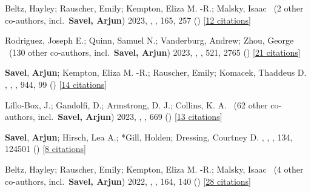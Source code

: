 \item[{\color{numcolor}\scriptsize22}] Beltz, Hayley; Rauscher, Emily; Kempton, Eliza M. -R.; Malsky, Isaac \etal\ ({2} other co-authors, incl.\ \textbf{Savel, Arjun}) 2023, , \aj, {165}, 257 () [\href{https://ui.adsabs.harvard.edu/abs/2023AJ....165..257B}{12 citations}]

\item[{\color{numcolor}\scriptsize21}] Rodriguez, Joseph E.; Quinn, Samuel N.; Vanderburg, Andrew; Zhou, George \etal\ ({130} other co-authors, incl.\ \textbf{Savel, Arjun}) 2023, , \mnras, {521}, 2765 () [\href{https://ui.adsabs.harvard.edu/abs/2023MNRAS.521.2765R}{21 citations}]

\item[{\color{numcolor}\scriptsize20}] \textbf{Savel}, \textbf{Arjun}; Kempton, Eliza M. -R.; Rauscher, Emily; Komacek, Thaddeus D. , , \apj, {944}, 99 () [\href{https://ui.adsabs.harvard.edu/abs/2023ApJ...944...99S}{14 citations}]

\item[{\color{numcolor}\scriptsize19}] Lillo-Box, J.; Gandolfi, D.; Armstrong, D. J.; Collins, K. A. \etal\ ({62} other co-authors, incl.\ \textbf{Savel, Arjun}) 2023, , \aanda, {669} () [\href{https://ui.adsabs.harvard.edu/abs/2023A&A...669A.109L}{13 citations}]

\item[{\color{numcolor}\scriptsize18}] \textbf{Savel}, \textbf{Arjun}; Hirsch, Lea A.; *Gill, Holden; Dressing, Courtney D. , , \pasp, {134}, 124501 () [\href{https://ui.adsabs.harvard.edu/abs/2022PASP..134l4501S}{8 citations}]

\item[{\color{numcolor}\scriptsize17}] Beltz, Hayley; Rauscher, Emily; Kempton, Eliza M. -R.; Malsky, Isaac \etal\ ({4} other co-authors, incl.\ \textbf{Savel, Arjun}) 2022, , \aj, {164}, 140 () [\href{https://ui.adsabs.harvard.edu/abs/2022AJ....164..140B}{28 citations}]

